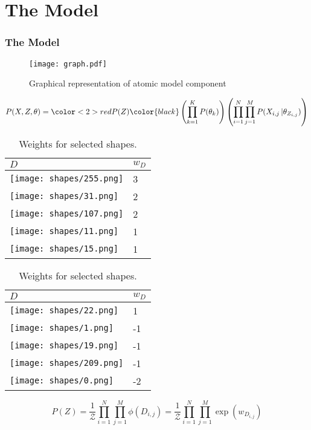 \documentclass{beamer}
\begin{document}
\section{The Model}
\begin{frame}
    \frametitle{The Model}
\begin{figure}
    \begin{center}
        \texttt{[image: graph.pdf]}
        \caption{Graphical representation of atomic model component}
        \label{fig:graph}
    \end{center}
\end{figure}

\[
    P(X,Z,\theta) = \color<2>{red} P(Z) \color{black} \left(\prod_{k=1}^KP(\theta_k)\right)
\left(\prod_{i=1}^N\prod_{j=1}^MP(X_{i,j}\,|\theta_{Z_{i,j}})\right)
\]
\end{frame}

\begin{frame}
\begin{table}
    \begin{center}
    \begin{tabular}{| l | l |}
        \hline
        $D$ & $w_D$ \\ \hline
        \texttt{[image: shapes/255.png]} & 3\\
        \texttt{[image: shapes/31.png]} & 2\\
        \texttt{[image: shapes/107.png]} & 2\\
        \texttt{[image: shapes/11.png]} & 1\\
        \texttt{[image: shapes/15.png]} & 1\\
        \hline
    \end{tabular}
    \begin{tabular}{| l | l |}
        \hline
        $D$ & $w_D$ \\ \hline
        \texttt{[image: shapes/22.png]} & 1\\
        \texttt{[image: shapes/1.png]} & -1\\
        \texttt{[image: shapes/19.png]} & -1\\
        \texttt{[image: shapes/209.png]} & -1\\
        \texttt{[image: shapes/0.png]} & -2\\
        \hline
    \end{tabular}
    \end{center}
    \caption{Weights for selected shapes.}
    \label{table:shapes}
\end{table}
\[
P(Z) = \frac{1}{\mathcal{Z}}\prod_{i=1}^N\prod_{j=1}^M \phi(D_{i,j})
= \frac{1}{\mathcal{Z}}\prod_{i=1}^N\prod_{j=1}^M \exp(w_{D_{i,j}})
\]
\end{frame}
\end{document}
